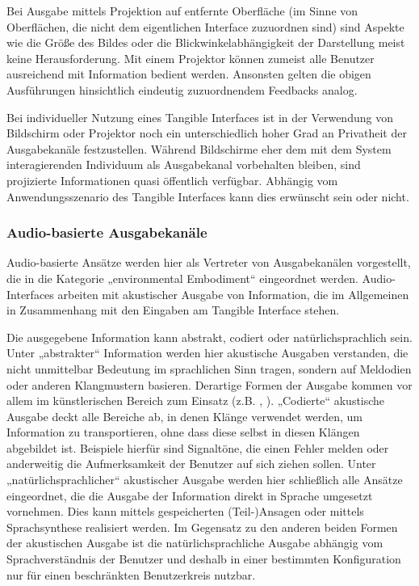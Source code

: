Bei Ausgabe mittels Projektion auf entfernte Oberfläche (im Sinne von Oberflächen, die nicht dem eigentlichen Interface zuzuordnen sind) sind Aspekte wie die Größe des Bildes oder die Blickwinkelabhängigkeit der Darstellung meist keine Herausforderung. Mit einem Projektor können zumeist alle Benutzer ausreichend mit Information bedient werden. Ansonsten gelten die obigen Ausführungen hinsichtlich eindeutig zuzuordnendem Feedbacks analog.

Bei individueller Nutzung eines Tangible Interfaces ist in der Verwendung von Bildschirm oder Projektor noch ein unterschiedlich hoher Grad an Privatheit der Ausgabekanäle festzustellen. Während Bildschirme eher dem mit dem System interagierenden Individuum als Ausgabekanal vorbehalten bleiben, sind projizierte Informationen quasi öffentlich verfügbar. Abhängig vom Anwendungsszenario des Tangible Interfaces kann dies erwünscht sein oder nicht.


\subsubsection{Audio-basierte Ausgabekanäle} %
\label{ssub:audioausgabe}

Audio-basierte Ansätze werden hier als Vertreter von Ausgabekanälen vorgestellt, die in die Kategorie „environmental Embodiment“ eingeordnet werden. Audio-Interfaces arbeiten mit akustischer Ausgabe von Information, die im Allgemeinen in Zusammenhang mit den Eingaben am Tangible Interface stehen. 

Die ausgegebene Information kann abstrakt, codiert oder natürlichsprachlich sein. Unter „abstrakter“ Information werden hier akustische Ausgaben verstanden, die nicht unmittelbar Bedeutung im sprachlichen Sinn tragen, sondern auf Meldodien oder anderen Klangmustern basieren. Derartige Formen der Ausgabe kommen vor allem im künstlerischen Bereich zum Einsatz (z.B. \citep{Kaltenbrunner06}, \citep{Pedersen09}). „Codierte“ akustische Ausgabe deckt alle Bereiche ab, in denen Klänge verwendet werden, um Information zu transportieren, ohne dass diese selbst in diesen Klängen abgebildet ist. Beispiele hierfür sind Signaltöne, die einen Fehler melden oder anderweitig die Aufmerksamkeit der Benutzer auf sich ziehen sollen. Unter „natürlichsprachlicher“ akustischer Ausgabe werden hier schließlich alle Ansätze eingeordnet, die die Ausgabe der Information direkt in Sprache umgesetzt vornehmen. Dies kann mittels gespeicherten (Teil-)Ansagen oder mittels Sprachsynthese realisiert werden. Im Gegensatz zu den anderen beiden Formen der akustischen Ausgabe ist die natürlichsprachliche Ausgabe abhängig vom Sprachverständnis der Benutzer und deshalb in einer bestimmten Konfiguration nur für einen beschränkten Benutzerkreis nutzbar.

